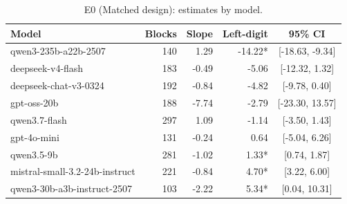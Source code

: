 \begin{table}[t]
\centering
\caption{E0 (Matched design): estimates by model.}
\label{tab:e0model}
\small
\begin{tabular}{lrrrc}
\toprule
Model & Blocks & Slope & Left-digit & 95\% CI \\
\midrule
qwen3-235b-a22b-2507 & 140 & 1.29 & -14.22* & [-18.63, -9.34] \\
deepseek-v4-flash & 183 & -0.49 & -5.06 & [-12.32, 1.32] \\
deepseek-chat-v3-0324 & 192 & -0.84 & -4.82 & [-9.78, 0.40] \\
gpt-oss-20b & 188 & -7.74 & -2.79 & [-23.30, 13.57] \\
qwen3.7-flash & 297 & 1.09 & -1.14 & [-3.50, 1.43] \\
gpt-4o-mini & 131 & -0.24 & 0.64 & [-5.04, 6.26] \\
qwen3.5-9b & 281 & -1.02 & 1.33* & [0.74, 1.87] \\
mistral-small-3.2-24b-instruct & 221 & -0.84 & 4.70* & [3.22, 6.00] \\
qwen3-30b-a3b-instruct-2507 & 103 & -2.22 & 5.34* & [0.04, 10.31] \\
\bottomrule
\end{tabular}
\end{table}
